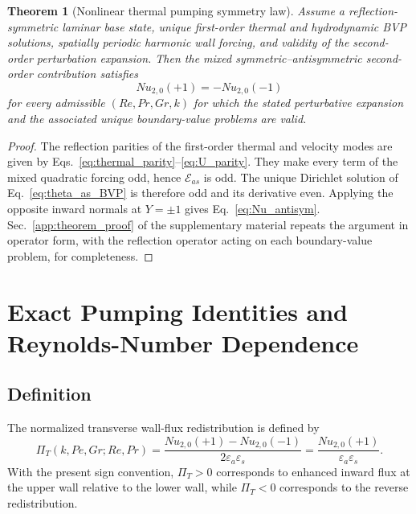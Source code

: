 \documentclass[12pt,a4paper]{article}
\newcommand{\Rey}{\mathit{Re}}
\newcommand{\Pe}{\mathit{Pe}}
\newcommand{\Grr}{\mathit{Gr}}
\newcommand{\Nu}{\mathit{Nu}}
\renewcommand{\Pr}{\mathit{Pr}}
\newcommand{\PiT}{\Pi_T}
\newtheorem{theorem}{Theorem}
\begin{document}
\begin{theorem}[Nonlinear thermal pumping symmetry law]
\label{thm:symmetry}
Assume a reflection-symmetric laminar base state, unique first-order thermal and hydrodynamic BVP
solutions, spatially periodic harmonic wall forcing, and validity of the second-order perturbation
expansion. Then the mixed symmetric--antisymmetric second-order contribution satisfies
\begin{equation}
  \Nu_{2,0}(+1)
  =
  -\Nu_{2,0}(-1)
\end{equation}
for every admissible $(\Rey,\Pr,\Grr,k)$ for which the stated perturbative
expansion and the associated unique boundary-value problems are valid.
\end{theorem}
\begin{proof}
The reflection parities of the first-order thermal and velocity modes are given by
Eqs.~\eqref{eq:thermal_parity}--\eqref{eq:U_parity}. They make every term of the mixed quadratic forcing odd,
hence $\mathcal E_{as}$ is odd. The unique Dirichlet solution of Eq.~\eqref{eq:theta_as_BVP} is therefore
odd and its derivative even. Applying the opposite inward normals at $Y=\pm1$ gives
Eq.~\eqref{eq:Nu_antisym}. Sec.~\ref{app:theorem_proof} of the supplementary material repeats the
argument in operator form, with the reflection operator acting on each boundary-value
problem, for completeness.
\end{proof}

\section{Exact Pumping Identities and Reynolds-Number Dependence}

\subsection{Definition}

The normalized transverse wall-flux redistribution is defined by
\begin{equation}
  \PiT(k,\Pe,\Grr;\Rey,\Pr)
  =\frac{\Nu_{2,0}(+1)-\Nu_{2,0}(-1)}{2\varepsilon_a\varepsilon_s}
  =\frac{\Nu_{2,0}(+1)}{\varepsilon_a\varepsilon_s}.
  \label{eq:PiT_def}
\end{equation}
With the present sign convention, $\PiT>0$ corresponds to enhanced inward flux at the upper wall relative
to the lower wall, while $\PiT<0$ corresponds to the reverse redistribution.
\end{document}
